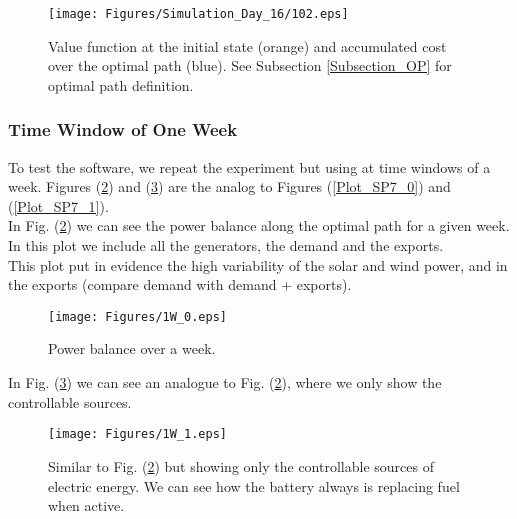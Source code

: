 \begin{figure}[H]
\centering
\texttt{[image: Figures/Simulation\_Day\_16/102.eps]}
\caption{Value function at the initial state (orange) and accumulated cost over the optimal path (blue). See Subsection \ref{Subsection_OP} for optimal path definition.}
\label{Plot_SP7_5}
\end{figure}

\subsubsection{Time Window of One Week}

To test the software, we repeat the experiment but using at time windows of a week. Figures (\ref{Plot_SP7_6}) and (\ref{Plot_SP7_7}) are the analog to Figures (\ref{Plot_SP7_0}) and (\ref{Plot_SP7_1}).\\

In Fig. (\ref{Plot_SP7_6}) we can see the power balance along the optimal path for a given week. In this plot we include all the generators, the demand and the exports.\\
This plot put in evidence the high variability of the solar and wind power, and in the exports (compare demand with demand + exports).

\begin{figure}[H]
\centering
\texttt{[image: Figures/1W\_0.eps]}
\caption{Power balance over a week.}
\label{Plot_SP7_6}
\end{figure}

In Fig. (\ref{Plot_SP7_7}) we can see an analogue to Fig. (\ref{Plot_SP7_6}), where we only show the controllable sources. 

\begin{figure}[H]
\centering
\texttt{[image: Figures/1W\_1.eps]}
\caption{Similar to Fig. (\ref{Plot_SP7_6}) but showing only the controllable sources of electric energy. We can see how the battery always is replacing fuel when active.}
\label{Plot_SP7_7}
\end{figure}

%
